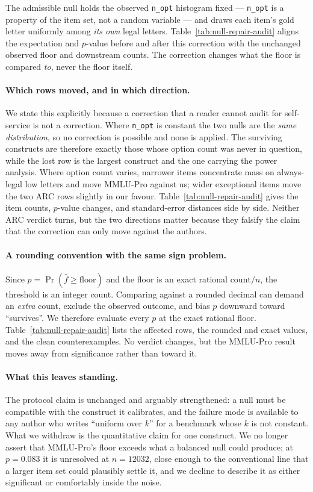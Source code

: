 The admissible null holds the observed \texttt{n\_opt} histogram fixed --- \texttt{n\_opt} is a property of the item set, not a random variable --- and draws each item's gold letter uniformly among \emph{its own} legal letters. Table~\ref{tab:null-repair-audit} aligns the expectation and $p$-value before and after this correction with the unchanged observed floor and downstream counts. The correction changes what the floor is compared \emph{to}, never the floor itself.

\paragraph{Which rows moved, and in which direction.} We state this explicitly because a correction that a reader cannot audit for self-service is not a correction. Where \texttt{n\_opt} is constant the two nulls are the \emph{same distribution}, so no correction is possible and none is applied. The surviving constructs are therefore exactly those whose option count was never in question, while the lost row is the largest construct and the one carrying the power analysis. Where option count varies, narrower items concentrate mass on always-legal low letters and move MMLU-Pro against us; wider exceptional items move the two ARC rows slightly in our favour. Table~\ref{tab:null-repair-audit} gives the item counts, $p$-value changes, and standard-error distances side by side. Neither ARC verdict turns, but the two directions matter because they falsify the claim that the correction can only move against the authors.

\paragraph{A rounding convention with the same sign problem.} Since $p=\Pr(\hat f\ge\text{floor})$ and the floor is an exact rational $\text{count}/n$, the threshold is an integer count. Comparing against a rounded decimal can demand an \emph{extra} count, exclude the observed outcome, and bias $p$ downward toward ``survives''. We therefore evaluate every $p$ at the exact rational floor. Table~\ref{tab:null-repair-audit} lists the affected rows, the rounded and exact values, and the clean counterexamples. No verdict changes, but the MMLU-Pro result moves away from significance rather than toward it.



\paragraph{What this leaves standing.} The protocol claim is unchanged and arguably strengthened: a null must be compatible with the construct it calibrates, and the failure mode is available to any author who writes ``uniform over $k$'' for a benchmark whose $k$ is not constant. What we withdraw is the quantitative claim for one construct. We no longer assert that MMLU-Pro's floor exceeds what a balanced null could produce; at $p=0.083$ it is unresolved at $n=12032$, close enough to the conventional line that a larger item set could plausibly settle it, and we decline to describe it as either significant or comfortably inside the noise.


\FloatBarrier


\FloatBarrier

